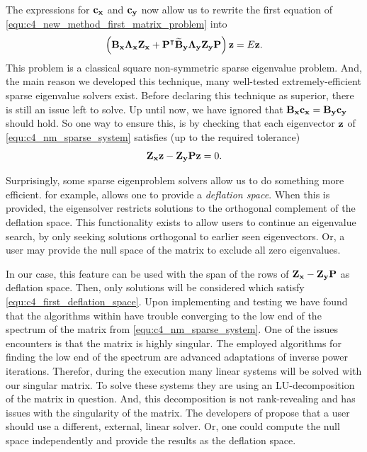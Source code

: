 The expressions for $\vb{c_x}$ and $\vb{c_y}$ now allow us to rewrite the first equation of \eqref{equ:c4_new_method_first_matrix_problem} into
\begin{equation}\label{equ:c4_nm_sparse_system}
    \left(\vb{B_x}\vb{\Lambda_x} \vb{Z_x} + {\vb{P}}^\intercal\vb{\widetilde{B}_y}\vb{\Lambda_y}  \vb{Z_y} \vb{P}\right) \vb{z} = E \vb{z} \text{.}
\end{equation}
This problem is a classical square non-symmetric sparse eigenvalue problem. And, the main reason we developed this technique, many well-tested extremely-efficient sparse eigenvalue solvers exist. Before declaring this technique as superior, there is still an issue left to solve. Up until now, we have ignored that $\vb{B_x} \vb{c_x} = \vb{B_y} \vb{c_y}$ should hold. So one way to ensure this, is by checking that each eigenvector $\vb{z}$ of \eqref{equ:c4_nm_sparse_system} satisfies (up to the required tolerance)
\begin{equation}\label{equ:c4_first_deflation_space}
    \vb{Z_x} \vb{z} -\vb{Z_y} \vb{P} \vb{z} =0 \text{.}
\end{equation}

Surprisingly, some sparse eigenproblem solvers allow us to do something more efficient. \slepc{} \cite{hernandez_slepc_2005} for example, allows one to provide a \emph{deflation space}. When this is provided, the eigensolver restricts solutions to the orthogonal complement of the deflation space. This functionality exists to allow users to continue an eigenvalue search, by only seeking solutions orthogonal to earlier seen eigenvectors. Or, a user may provide the null space of the matrix to exclude all zero eigenvalues.

In our case, this feature can be used with the span of the rows of $\vb{Z_x} - \vb{Z_y} \vb{P}$ as deflation space. Then, only solutions will be considered which satisfy \eqref{equ:c4_first_deflation_space}. Upon implementing and testing we have found that the algorithms within \slepc{} have trouble converging to the low end of the spectrum of the matrix from \eqref{equ:c4_nm_sparse_system}. One of  the issues \slepc{} encounters is that the matrix is highly singular. The employed algorithms for finding the low end of the spectrum are advanced adaptations of inverse power iterations. Therefor, during the execution many linear systems will be solved with our singular matrix. To solve these systems they are using an LU-decomposition of the matrix in question. And, this decomposition is not rank-revealing and has issues with the singularity of the matrix. The developers of \slepc{} propose that a user should use a different, external, linear solver. Or, one could compute the null space independently and provide the results as the deflation space.


